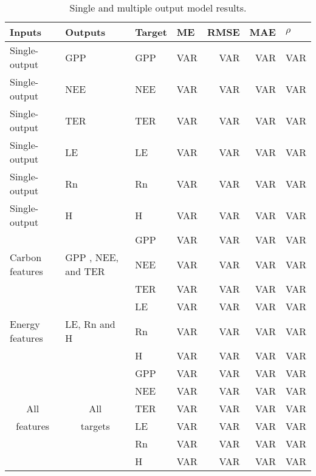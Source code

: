 \begin{table}[htbp]
\caption{Single and multiple output model results.}
\begin{center}
  \begin{tabular}{|l|l|l|r|r|r|r|}
    \hline
    Inputs & Outputs & Target & \multicolumn{1}{l|}{ME} & \multicolumn{1}{l|}{RMSE} & \multicolumn{1}{l|}{MAE} & \multicolumn{1}{l|}{$\rho$} \\ \hline
    Single-output & GPP & GPP & VAR & VAR & VAR & VAR \\ \hline
    Single-output & NEE  & NEE & VAR & VAR & VAR & VAR \\ \hline
    Single-output & TER  & TER & VAR & VAR & VAR & VAR \\ \hline
    Single-output & LE  & LE & VAR & VAR & VAR & VAR \\ \hline
    Single-output & Rn  & Rn & VAR & VAR & VAR & VAR \\ \hline
    Single-output & H   & H & VAR & VAR & VAR & VAR \\ \hline
    \multicolumn{ 1}{|c|}{} & \multicolumn{ 1}{c|}{} & GPP & VAR & VAR & VAR & VAR \\ \cline{ 3- 6}
    \multicolumn{ 1}{|l|}{Carbon features} & \multicolumn{ 1}{l|}{GPP , NEE, and TER} & NEE & VAR & VAR & VAR & VAR \\ \cline{ 3- 6}
    \multicolumn{ 1}{|l|}{} & \multicolumn{ 1}{l|}{} & TER & VAR & VAR & VAR & VAR \\ \hline
    \multicolumn{ 1}{|c|}{} & \multicolumn{ 1}{c|}{} & LE & VAR & VAR & VAR & VAR \\ \cline{ 3- 6}
    \multicolumn{ 1}{|l|}{Energy features} & \multicolumn{ 1}{l|}{LE, Rn and H} &  Rn & VAR & VAR & VAR & VAR \\ \cline{ 3- 6}
    \multicolumn{ 1}{|l|}{} & \multicolumn{ 1}{l|}{} &  H & VAR & VAR & VAR & VAR \\ \hline
    \multicolumn{ 1}{|c|}{} & \multicolumn{ 1}{c|}{} & GPP& VAR & VAR & VAR & VAR \\ \cline{ 3- 6}
    \multicolumn{ 1}{|c|}{} & \multicolumn{ 1}{l|}{} & NEE & VAR & VAR & VAR & VAR \\ \cline{ 3- 6}
    \multicolumn{ 1}{|c|}{All} & \multicolumn{ 1}{c|}{All} & TER & VAR & VAR & VAR & VAR \\ \cline{ 3- 6}
    \multicolumn{ 1}{|c|}{features} & \multicolumn{ 1}{c|}{targets} & LE & VAR & VAR & VAR & VAR \\ \cline{ 3- 6}
    \multicolumn{ 1}{|l|}{} & \multicolumn{ 1}{l|}{} & Rn & VAR & VAR & VAR & VAR \\ \cline{ 3- 6}
    \multicolumn{ 1}{|l|}{} & \multicolumn{ 1}{l|}{} & H & VAR & VAR & VAR & VAR \\ \hline
\end{tabular}
\end{center}
\label{results}
\end{table}
